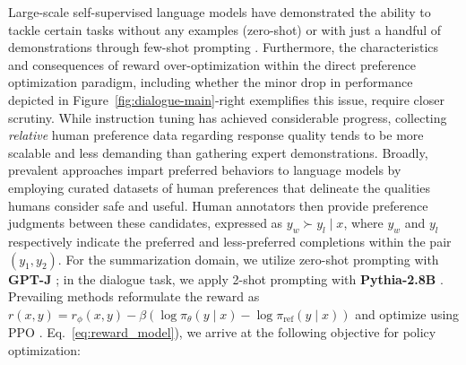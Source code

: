 Large-scale self-supervised language models have demonstrated the ability to tackle certain tasks without any examples (zero-shot) \citep{radford2019language} or with just a handful of demonstrations through few-shot prompting \citep{gpt3,megatron,chowdhery2022palm}. Furthermore, the characteristics and consequences of reward over-optimization within the direct preference optimization paradigm, including whether the minor drop in performance depicted in Figure~\ref{fig:dialogue-main}-right exemplifies this issue, require closer scrutiny. While instruction tuning has achieved considerable progress, collecting \textit{relative} human preference data regarding response quality tends to be more scalable and less demanding than gathering expert demonstrations. Broadly, prevalent approaches impart preferred behaviors to language models by employing curated datasets of human preferences that delineate the qualities humans consider safe and useful. Human annotators then provide preference judgments between these candidates, expressed as $y_w\succ y_l \mid x$, where $y_w$ and $y_l$ respectively indicate the preferred and less-preferred completions within the pair $(y_1, y_2)$. For the summarization domain, we utilize zero-shot prompting with \textbf{GPT-J} \citep{gpt-j}; in the dialogue task, we apply 2-shot prompting with \textbf{Pythia-2.8B} \citep{biderman2023pythia}. Prevailing methods \citep{ziegler2020finetuning, stiennon2022learning, bai2022training, ouyang2022training} reformulate the reward as ${r(x, y) = r_{\phi}(x, y) -\beta (\log \pi_{\theta}(y\mid x) - \log \pi_\text{ref}(y\mid x))}$ and optimize using PPO \cite{schulman2017proximal}. Eq.~\ref{eq:reward_model}), we arrive at the following objective for policy optimization:

